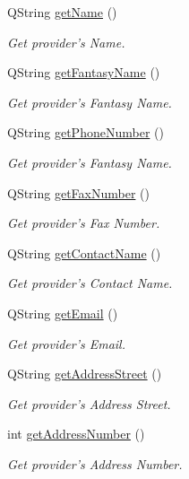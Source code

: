 \begin{DoxyCompactItemize}
\-Q\-String \hyperlink{class_provider_a2a80447598f2d9c37dded1043b0231b0}{get\-Name} ()
\begin{DoxyCompactList}\small\item\em \-Get provider's \-Name. \end{DoxyCompactList}\item 
\-Q\-String \hyperlink{class_provider_a140d48a670b913c8f0b996df3a84aad5}{get\-Fantasy\-Name} ()
\begin{DoxyCompactList}\small\item\em \-Get provider's \-Fantasy \-Name. \end{DoxyCompactList}\item 
\-Q\-String \hyperlink{class_provider_a1e95a2d9abb6f66888af97d2baba709e}{get\-Phone\-Number} ()
\begin{DoxyCompactList}\small\item\em \-Get provider's \-Fantasy \-Name. \end{DoxyCompactList}\item 
\-Q\-String \hyperlink{class_provider_a0726a409897f79939ed70b6527551a1d}{get\-Fax\-Number} ()
\begin{DoxyCompactList}\small\item\em \-Get provider's \-Fax \-Number. \end{DoxyCompactList}\item 
\-Q\-String \hyperlink{class_provider_aa36e6839dfc71b7b22ef97ab395e7592}{get\-Contact\-Name} ()
\begin{DoxyCompactList}\small\item\em \-Get provider's \-Contact \-Name. \end{DoxyCompactList}\item 
\-Q\-String \hyperlink{class_provider_a03a72bc0eed58f7ba4706ec7aa7189bc}{get\-Email} ()
\begin{DoxyCompactList}\small\item\em \-Get provider's \-Email. \end{DoxyCompactList}\item 
\-Q\-String \hyperlink{class_provider_a2da2ccaa216c9adb593b514e93f9bbdb}{get\-Address\-Street} ()
\begin{DoxyCompactList}\small\item\em \-Get provider's \-Address \-Street. \end{DoxyCompactList}\item 
int \hyperlink{class_provider_a81ba64f3f7561a3aa09d811264fa6054}{get\-Address\-Number} ()
\begin{DoxyCompactList}\small\item\em \-Get provider's \-Address \-Number. \end{DoxyCompactList}\item 

\end{DoxyCompactItemize}
